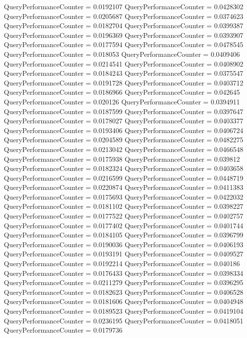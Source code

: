 \documentclass[9pt]{article}
\theoremstyle{plain}
\theoremstyle{definition}
\theoremstyle{remark}
\numberwithin{equation}{section}
\begin{document}
QueryPerformanceCounter  =  0.0192107
QueryPerformanceCounter  =  0.0428302
QueryPerformanceCounter  =  0.0205687
QueryPerformanceCounter  =  0.0374623
QueryPerformanceCounter  =  0.0182704
QueryPerformanceCounter  =  0.0399387
QueryPerformanceCounter  =  0.0196369
QueryPerformanceCounter  =  0.0393907
QueryPerformanceCounter  =  0.0177594
QueryPerformanceCounter  =  0.0478545
QueryPerformanceCounter  =  0.018053
QueryPerformanceCounter  =  0.0409406
QueryPerformanceCounter  =  0.0214541
QueryPerformanceCounter  =  0.0408902
QueryPerformanceCounter  =  0.0184243
QueryPerformanceCounter  =  0.0375547
QueryPerformanceCounter  =  0.0191728
QueryPerformanceCounter  =  0.0403712
QueryPerformanceCounter  =  0.0186966
QueryPerformanceCounter  =  0.042645
QueryPerformanceCounter  =  0.020126
QueryPerformanceCounter  =  0.0394911
QueryPerformanceCounter  =  0.0187599
QueryPerformanceCounter  =  0.0397647
QueryPerformanceCounter  =  0.0178027
QueryPerformanceCounter  =  0.0403377
QueryPerformanceCounter  =  0.0193406
QueryPerformanceCounter  =  0.0406724
QueryPerformanceCounter  =  0.0204589
QueryPerformanceCounter  =  0.0482275
QueryPerformanceCounter  =  0.0213042
QueryPerformanceCounter  =  0.0466548
QueryPerformanceCounter  =  0.0175938
QueryPerformanceCounter  =  0.039812
QueryPerformanceCounter  =  0.0182324
QueryPerformanceCounter  =  0.0403658
QueryPerformanceCounter  =  0.0216599
QueryPerformanceCounter  =  0.0448719
QueryPerformanceCounter  =  0.0220874
QueryPerformanceCounter  =  0.0411383
QueryPerformanceCounter  =  0.0175693
QueryPerformanceCounter  =  0.0422032
QueryPerformanceCounter  =  0.0181102
QueryPerformanceCounter  =  0.0398227
QueryPerformanceCounter  =  0.0177522
QueryPerformanceCounter  =  0.0402757
QueryPerformanceCounter  =  0.0177402
QueryPerformanceCounter  =  0.0401744
QueryPerformanceCounter  =  0.0184105
QueryPerformanceCounter  =  0.0396799
QueryPerformanceCounter  =  0.0190036
QueryPerformanceCounter  =  0.0406193
QueryPerformanceCounter  =  0.0193191
QueryPerformanceCounter  =  0.0409527
QueryPerformanceCounter  =  0.0192214
QueryPerformanceCounter  =  0.040186
QueryPerformanceCounter  =  0.0176433
QueryPerformanceCounter  =  0.0398334
QueryPerformanceCounter  =  0.0211279
QueryPerformanceCounter  =  0.0396295
QueryPerformanceCounter  =  0.0182623
QueryPerformanceCounter  =  0.0406528
QueryPerformanceCounter  =  0.0181606
QueryPerformanceCounter  =  0.0404948
QueryPerformanceCounter  =  0.0189523
QueryPerformanceCounter  =  0.0419104
QueryPerformanceCounter  =  0.0236195
QueryPerformanceCounter  =  0.0418051
QueryPerformanceCounter  =  0.0179736
\end{document}
